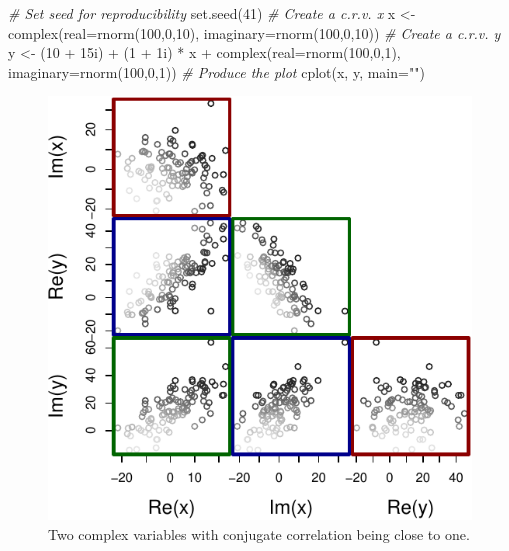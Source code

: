 \documentclass[
]{book}
\newenvironment{Shaded}{\begin{snugshade}}{\end{snugshade}}
\newcommand{\AttributeTok}[1]{\textcolor[rgb]{0.77,0.63,0.00}{#1}}
\newcommand{\CommentTok}[1]{\textcolor[rgb]{0.56,0.35,0.01}{\textit{#1}}}
\newcommand{\DecValTok}[1]{\textcolor[rgb]{0.00,0.00,0.81}{#1}}
\newcommand{\FunctionTok}[1]{\textcolor[rgb]{0.00,0.00,0.00}{#1}}
\newcommand{\NormalTok}[1]{#1}
\newcommand{\OtherTok}[1]{\textcolor[rgb]{0.56,0.35,0.01}{#1}}
\newcommand{\SpecialCharTok}[1]{\textcolor[rgb]{0.00,0.00,0.00}{#1}}
\newcommand{\StringTok}[1]{\textcolor[rgb]{0.31,0.60,0.02}{#1}}
\begin{document}
\begin{Shaded}
\begin{Highlighting}[]
\CommentTok{\# Set seed for reproducibility}
\FunctionTok{set.seed}\NormalTok{(}\DecValTok{41}\NormalTok{)}
\CommentTok{\# Create a c.r.v. x}
\NormalTok{x }\OtherTok{\textless{}{-}} \FunctionTok{complex}\NormalTok{(}\AttributeTok{real=}\FunctionTok{rnorm}\NormalTok{(}\DecValTok{100}\NormalTok{,}\DecValTok{0}\NormalTok{,}\DecValTok{10}\NormalTok{), }\AttributeTok{imaginary=}\FunctionTok{rnorm}\NormalTok{(}\DecValTok{100}\NormalTok{,}\DecValTok{0}\NormalTok{,}\DecValTok{10}\NormalTok{))}
\CommentTok{\# Create a c.r.v. y}
\NormalTok{y }\OtherTok{\textless{}{-}}\NormalTok{ (}\DecValTok{10} \SpecialCharTok{+}\NormalTok{ 15i) }\SpecialCharTok{+}\NormalTok{ (}\DecValTok{1} \SpecialCharTok{+}\NormalTok{ 1i) }\SpecialCharTok{*}\NormalTok{ x }\SpecialCharTok{+}
    \FunctionTok{complex}\NormalTok{(}\AttributeTok{real=}\FunctionTok{rnorm}\NormalTok{(}\DecValTok{100}\NormalTok{,}\DecValTok{0}\NormalTok{,}\DecValTok{1}\NormalTok{), }\AttributeTok{imaginary=}\FunctionTok{rnorm}\NormalTok{(}\DecValTok{100}\NormalTok{,}\DecValTok{0}\NormalTok{,}\DecValTok{1}\NormalTok{))}
\CommentTok{\# Produce the plot}
\FunctionTok{cplot}\NormalTok{(x, y, }\AttributeTok{main=}\StringTok{""}\NormalTok{)}
\end{Highlighting}
\end{Shaded}

\begin{figure}
\centering
\includegraphics{Svetunkov---Svetunkov---Complex-Valued-Econometrics_files/figure-latex/crvCorConjugate-1.pdf}
\caption{\label{fig:crvCorConjugate}Two complex variables with conjugate correlation being close to one.}
\end{figure}
\end{document}
